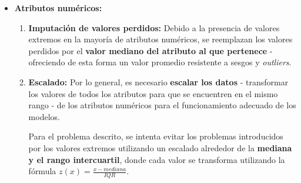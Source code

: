\begin{itemize}[leftmargin=*, parsep=1pt, itemsep=1pt, topsep=4pt]
	\item \textbf{Atributos numéricos:}
	
	\begin{enumerate}
		\item \textbf{Imputación de valores perdidos:} Debido a la presencia de valores extremos en la mayoría de atributos numéricos, se reemplazan los valores perdidos por el \textbf{valor mediano del atributo al que pertenece} - ofreciendo de esta forma un valor promedio resistente a sesgos y \textit{outliers}.
		\item \textbf{Escalado:} Por lo general, es necesario \textbf{escalar los datos} - transformar los valores de todos los atributos para que se encuentren en el mismo rango - de los atributos numéricos para el funcionamiento adecuado de los modelos.
		
		Para el problema descrito, se intenta evitar los problemas introducidos por los valores extremos utilizando un escalado alrededor de la \textbf{mediana y el rango intercuartil}, donde cada valor se transforma utilizando la fórmula $z(x) = \frac{x - mediana}{IQR}$. 
	\end{enumerate}
\end{itemize}